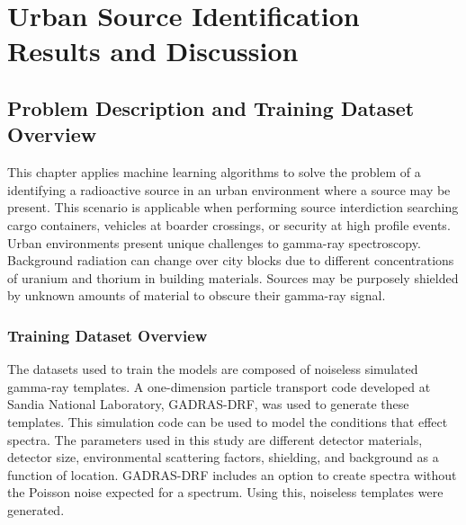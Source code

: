 \chapter{Urban Source Identification Results and Discussion}





\section{Problem Description and Training Dataset Overview}

This chapter applies machine learning algorithms to solve the problem of a identifying a radioactive source in an urban environment where a source may be present. This scenario is applicable when performing source interdiction searching cargo containers, vehicles at boarder crossings, or security at high profile events. Urban environments present unique challenges to gamma-ray spectroscopy. Background radiation can change over city blocks due to different concentrations of uranium and thorium in building materials. Sources may be purposely shielded by unknown amounts of material to obscure their gamma-ray signal.


\subsection{Training Dataset Overview}

The datasets used to train the models are composed of noiseless simulated gamma-ray templates. A one-dimension particle transport code developed at Sandia National Laboratory, GADRAS-DRF, was used to generate these templates. This simulation code can be used to model the conditions that effect spectra. The parameters used in this study are different detector materials, detector size, environmental scattering factors, shielding, and background as a function of location. GADRAS-DRF includes an option to create spectra without the Poisson noise expected for a spectrum. Using this, noiseless templates were generated.



